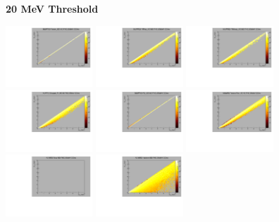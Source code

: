 \textbf{20 MeV Threshold}

\begin{center}

  \includegraphics[width=0.245\textwidth]{plots/response_matrix/Proton_KE_FHC_CCInc_20MeV.pdf}
  \includegraphics[width=0.245\textwidth]{plots/response_matrix/PiPlus_KE_FHC_CCInc_20MeV.pdf}
  \includegraphics[width=0.245\textwidth]{plots/response_matrix/PiMinus_KE_FHC_CCInc_20MeV.pdf}
  \includegraphics[width=0.245\textwidth]{plots/response_matrix/Charged_Pi_KE_FHC_CCInc_20MeV.pdf}
  \includegraphics[width=0.245\textwidth]{plots/response_matrix/Pi0_KE_FHC_CCInc_20MeV.pdf}
  \includegraphics[width=0.245\textwidth]{plots/response_matrix/Proton+Pion_KE_FHC_CCInc_20MeV.pdf}
  \includegraphics[width=0.245\textwidth]{plots/response_matrix/Total_FHC_CCInc_20MeV.pdf}
  \includegraphics[width=0.245\textwidth]{plots/response_matrix/Hadrons_FHC_CCInc_20MeV.pdf}

\end{center}


